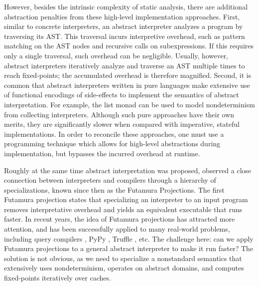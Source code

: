 However, besides the intrinsic complexity of static analysis, there are
additional abstraction penalties from these high-level implementation
approaches. First, similar to concrete interpreters, an abstract interpreter
analyzes a program by traversing its AST. This traversal incurs interpretive
overhead, such as pattern matching on the AST nodes and recursive calls on
subexpressions. If this requires only a single traversal, such overhead can be
negligible. Usually, however, abstract interpreters iteratively analyze and
traverse an AST multiple times to reach fixed-points; the accumulated overhead
is therefore magnified.
Second, it is common that abstract interpreters written in pure languages make
extensive use of functional encodings of side-effects to implement the semantics
of abstract interpretation.  For example, the list monad can be used to model
nondeterminism from collecting interpreters. Although such pure approaches have
their own merits, they are significantly slower when compared with imperative,
stateful implementations.  In order to reconcile these approaches, one must use
a programming technique which allows for high-level abstractions during
implementation, but bypasses the incurred overhead at runtime.

Roughly at the same time abstract interpretation was proposed,
\citet{futamura1971partial} observed a close connection between interpreters and
compilers through a hierarchy of specializations, known since then as the
Futamura Projections. The first Futamura projection states that specializing an
interpreter to an input program removes interpretative overhead and yields an
equivalent executable that runs faster. In recent years, the idea of Futamura
projections has attracted more attention, and has been successfully applied to
many real-world problems, including query compilers
\cite{DBLP:conf/sigmod/TahboubER18}, PyPy \cite{Bolz:2009:TMP:1565824.1565827},
Truffle \cite{Marr:2015:TVP:2814270.2814275}, etc. The challenge here: can we
apply Futamura projections to a general abstract interpreter to make it run
faster? The solution is not obvious, as we need to specialize a nonstandard
semantics that extensively uses nondeterminism, operates on abstract domains,
and computes fixed-points iteratively over caches.

